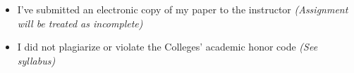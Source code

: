 \documentclass[11pt]{article}
\begin{document}
\vspace{0.5cm}

\begin{minipage}{0.135\textwidth}
\end{minipage}
\begin{minipage}{0.8\textwidth}
\hline\vspace{0.25cm}
\begin{itemize}\itemsep-0.25em
	\item I've submitted an electronic copy of my paper to the instructor {\it (Assignment will be treated as incomplete)}
\end{itemize}	
\hline\vspace{0.25cm} 
\end{minipage}

\vspace{0.5cm}

\begin{minipage}{0.135\textwidth}
\end{minipage}
\begin{minipage}{0.8\textwidth}
\hline\vspace{0.25cm}
\begin{itemize}\itemsep-0.25em
	\item I did not plagiarize or violate the Colleges' academic honor code {\it (See syllabus)}
\end{itemize}	
\hline\vspace{0.25cm} 
\end{minipage}

\end{document}
